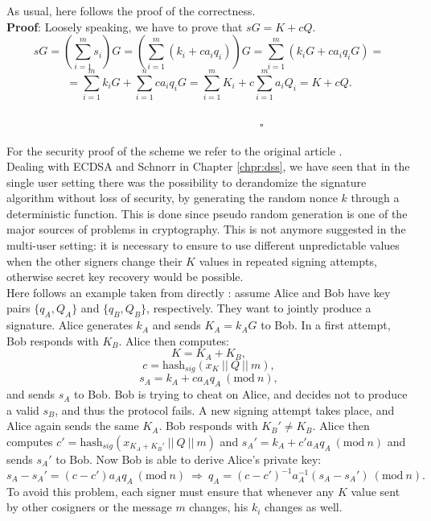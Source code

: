 \bigskip
\noindent
As usual, here follows the proof of the correctness.
\\
{\bf Proof}: Loosely speaking, we have to prove that $sG = K + cQ$.
\\
$$sG = \left(\sum_{i = 1}^{m} s_i\right)G = \left(\sum_{i = 1}^{m}(k_i + ca_iq_i)\right)G = \sum_{i = 1}^{m}(k_iG + ca_iq_iG) =$$
$$= \sum_{i = 1}^{m}k_iG + \sum_{i = 1}^{n} ca_iq_iG = \sum_{i = 1}^{m}K_i + c\sum_{i  = 1}^{m}a_iQ_i = K + cQ.$$
\ \ \ \ \ \ \ \ \ \ \ \ \ \ \ \ \ \ \ \ \ \ \ \ \ \ \ \ \ \ \ \ \ \ \ \ \ \ \ \ \ \ \ \ \ \ \ \ \ \ \ \ \ \ \ \ \ \ \ \ \ \ \ \ \ \ \ \ \ \ \ \ \ \ \ \ \ \ \ \ \ \ \ \ \ \ \ \ \ \ \ \ \ \ \ \ \ \ \ \ \ \ \ \ \ \ \ \ \ \ \ \ \ \ \ \ \ $\square$

\bigskip
\noindent
For the security proof of the scheme we refer to the original article \cite{RefWork:11}. 
\\
Dealing with ECDSA and Schnorr in Chapter \ref{chpr:dss}, we have seen that in the single user setting there was the possibility to derandomize the signature algorithm without loss of security, by generating the random nonce $k$ through a deterministic function. This is done since pseudo random generation is one of the major sources of problems in cryptography. This is not anymore suggested in the multi-user setting: it is necessary to ensure to use different unpredictable values when the other signers change their $K$ values in repeated signing attempts, otherwise secret key recovery would be possible. 
\\
Here follows an example taken from directly \cite{RefWork:11}: assume Alice and Bob have key pairs $\{q_A, Q_A\}$ and $\{q_B, Q_B\}$, respectively. They want to jointly produce a signature. Alice generates $k_A$ and sends $K_A = k_AG$ to Bob. In a first attempt, Bob responds with $K_B$. Alice then computes:
$$K = K_A + K_B,$$
$$c = \text{hash}_{sig}(x_K \ || \ Q \ || \ m),$$
$$s_A = k_A + ca_Aq_A \ (\text{mod} \ n),$$
and sends $s_A$ to Bob. Bob is trying to cheat on Alice, and decides not to produce a valid $s_B$, and thus the protocol fails. A new signing attempt takes place, and Alice again sends the same $K_A$. Bob responds with $K_B' \neq K_B$. Alice then computes $c' = \text{hash}_{sig}(x_{K_A + K_B'} \ || \ Q \ || \ m)$ and $s_A' = k_A + c'a_Aq_A \ (\text{mod} \ n)$ and sends $s_A'$ to Bob. Now Bob is able to derive Alice's private key:
$$s_A - s_A' = (c - c')a_Aq_A \ (\text{mod} \ n) \ \Longrightarrow \ q_A = (c - c')^{-1}a_A^{-1}(s_A - s_A') \ (\text{mod} \ n).$$
To avoid this problem, each signer must ensure that whenever any $K$ value sent by other cosigners or the message $m$ changes, his $k_i$ changes as well. 

